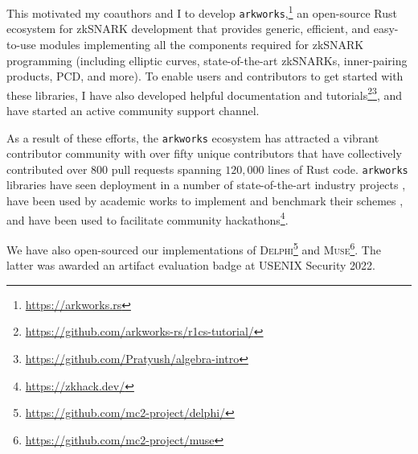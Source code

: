 \documentclass[11pt,letterpaper]{article}
\theoremstyle{definition} %
\theoremstyle{remark} %
\newcommand{\arkworks}{\texttt{arkworks}}
\begin{document}
{This motivated my coauthors and I to develop \arkworks{},\footnote{\url{https://arkworks.rs}} an open-source Rust ecosystem for zkSNARK development that provides generic, efficient, and easy-to-use modules implementing all the components required for zkSNARK programming (including elliptic curves, state-of-the-art zkSNARKs, inner-pairing products, PCD, and more). To enable users and contributors to get started with these libraries, I have also developed helpful documentation and tutorials\footnote{\url{https://github.com/arkworks-rs/r1cs-tutorial/}}\footnote{\url{https://github.com/Pratyush/algebra-intro}}, and have started an active community support channel.

As a result of these efforts, the \arkworks{} ecosystem  has attracted a vibrant contributor community with over fifty unique contributors that have collectively contributed over 800 pull requests spanning $120,000$ lines of Rust code. \arkworks{} libraries have seen deployment in a number of state-of-the-art industry projects \cite{mina-general, celo, anoma, manta, EberhardtT18, Noir}, have been used by academic works to implement and benchmark their schemes \cite{BoweCGMMW20,ChiesaHMMVW20,ChenCDW20,BagheryPR20,BunzCLMS21,BunzMMTV19,ZhangX21,TyagiFBT21,ChuXZ21,FengQZDC21,GurkanJMMST21,KohlweissMSV21,IliadiMHSKFVL21}, and have been used to facilitate community hackathons\footnote{\url{https://zkhack.dev/}}.

We have also open-sourced our implementations of \textsc{Delphi}\footnote{\url{https://github.com/mc2-project/delphi/}} and \textsc{Muse}\footnote{\url{https://github.com/mc2-project/muse}}. The latter was awarded an artifact evaluation badge at USENIX Security 2022.
}



\end{document}
